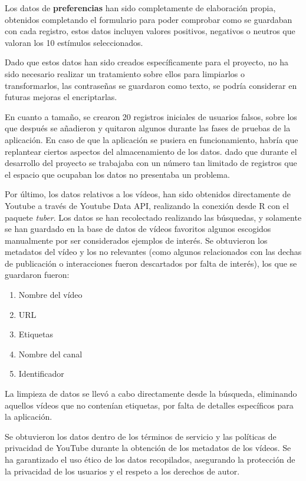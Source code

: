 \documentclass[a4paper,12pt,twoside]{memoir}
\begin{document}
Los datos de \textbf{preferencias} han sido completamente de elaboración propia, obtenidos completando el formulario para poder comprobar como se guardaban con cada registro, estos datos incluyen valores positivos, negativos o neutros que valoran los 10 estímulos seleccionados.

Dado que estos datos han sido creados específicamente para el proyecto, no ha sido necesario realizar un tratamiento sobre ellos para limpiarlos o transformarlos, las contraseñas se guardaron como texto, se podría considerar en futuras mejoras el encriptarlas.

En cuanto a tamaño, se crearon 20 registros iniciales de usuarios falsos, sobre los que después se añadieron y quitaron algunos durante las fases de pruebas de la aplicación. En caso de que la aplicación se pusiera en funcionamiento, habría que replantear ciertos aspectos del almacenamiento de los datos. dado que durante el desarrollo del proyecto se trabajaba con un número tan limitado de registros que el espacio que ocupaban los datos no presentaba un problema.

Por último, los datos relativos a los vídeos, han sido obtenidos directamente de Youtube a través de Youtube Data API, realizando la conexión desde R con el paquete \textit{tuber}. Los datos se han recolectado realizando las búsquedas, y solamente se han guardado en la base de datos de vídeos favoritos algunos escogidos manualmente por ser considerados ejemplos de interés. Se obtuvieron los metadatos del vídeo y los no relevantes (como algunos relacionados con las dechas de publicación o interacciones fueron descartados por falta de interés), los que se guardaron fueron:
\begin{enumerate}
    \item Nombre del vídeo
    \item URL
    \item Etiquetas
    \item Nombre del canal
    \item Identificador
\end{enumerate}

La limpieza de datos se llevó a cabo directamente desde la búsqueda, eliminando aquellos vídeos que no contenían etiquetas, por falta de detalles específicos para la aplicación.

Se obtuvieron los datos dentro de los términos de servicio y las políticas de privacidad de YouTube durante la obtención de los metadatos de los vídeos. Se ha garantizado el uso ético de los datos recopilados, asegurando la protección de la privacidad de los usuarios y el respeto a los derechos de autor.
\end{document}
